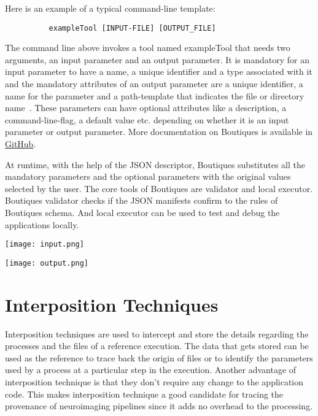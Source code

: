 
Here is an example of a typical command-line template:

\begin{verbatim}
          exampleTool [INPUT-FILE] [OUTPUT_FILE]
\end{verbatim}

The command line above invokes a tool named exampleTool that needs two arguments, an input parameter and an output parameter. It is mandatory for an input parameter to have a name, a unique identifier and a type associated with it and the mandatory attributes of an output parameter are a unique identifier, a name for the parameter and a path-template that indicates the file or directory name~\cite{boutiques}. These parameters can have optional attributes like a description, a command-line-flag, a default value etc. depending on whether it is an input parameter or output parameter. More documentation on Boutiques is available in \href{https://github.com/boutiques/boutiques/blob/master/examples/Getting\%20Started\%20with\%20Boutiques.ipynb}{GitHub}.

At runtime, with the help of the JSON descriptor, Boutiques substitutes all the mandatory parameters and the optional parameters with the original values selected by the user. The core tools of Boutiques are validator and local executor. Boutiques validator checks if the JSON manifests confirm to the rules of Boutiques schema. And local executor can be used to test and debug the applications locally.

\begin{center}
\texttt{[image: input.png]}
\label{fig:input}
\end{center}

\begin{center}
\texttt{[image: output.png]}
\label{fig:output}
\end{center}

\section{Interposition Techniques}\label{Interposition}
Interposition techniques are used to intercept and store the details regarding the processes and the files of a reference execution. 
The data that gets stored can be used as the reference to trace back the origin of files or to identify the parameters used by a process at a particular step in the execution. 
Another advantage of interposition technique is that they don't require any change to the application code. 
This makes interposition technique a good candidate for tracing the provenance of neuroimaging pipelines since it adds no overhead to the processing.

